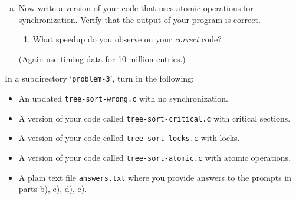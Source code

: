\documentclass[11pt]{article}
\begin{document}
\begin{enumerate}[a)]
  \item Now write a version of your code that uses atomic operations
  for synchronization. Verify that the output of your program is
  correct.
  \begin{enumerate}[1)]
    \item What speedup do you observe on your \emph{correct} code?
  \end{enumerate}
  (Again use timing data for 10 million entries.)
\end{enumerate}

In a subdirectory `\texttt{problem-3}', turn in the following:
\begin{itemize}
  \item An updated \texttt{tree-sort-wrong.c} with no synchronization.
  \item A version of your code called \texttt{tree-sort-critical.c} with critical
  sections.
  \item A version of your code called \texttt{tree-sort-locks.c} with locks.
  \item A version of your code called \texttt{tree-sort-atomic.c} with atomic operations.
  \item A plain text file \texttt{answers.txt} where you provide
  answers to the prompts in parts b), c), d), e).
\end{itemize}
\end{document}

